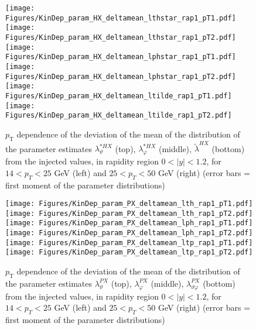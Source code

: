 \documentclass[12pt]{article}
\newcommand{\pT}{p_\mathrm{T}}
\newcommand{\absy}{\left |  y \right |}
\newcommand{\lamtildeHX}{\tilde{\lambda}^{\scriptscriptstyle HX}}
\newcommand{\lamthstarHX}{\lambda^{* \scriptscriptstyle HX}_\vartheta}
\newcommand{\lamphstarHX}{\lambda^{* \scriptscriptstyle HX}_\varphi}
\newcommand{\lamthPX}{\lambda^{\scriptscriptstyle PX}_\vartheta}
\newcommand{\lamphPX}{\lambda^{\scriptscriptstyle PX}_\varphi}
\newcommand{\lamthphPX}{\lambda^{\scriptscriptstyle PX}_{\vartheta \varphi}}
\begin{document}
\begin{figure}[htbp]
\centering
\texttt{[image: Figures/KinDep\_param\_HX\_deltamean\_lthstar\_rap1\_pT1.pdf]}
\texttt{[image: Figures/KinDep\_param\_HX\_deltamean\_lthstar\_rap1\_pT2.pdf]}
\texttt{[image: Figures/KinDep\_param\_HX\_deltamean\_lphstar\_rap1\_pT1.pdf]}
\texttt{[image: Figures/KinDep\_param\_HX\_deltamean\_lphstar\_rap1\_pT2.pdf]}
\texttt{[image: Figures/KinDep\_param\_HX\_deltamean\_ltilde\_rap1\_pT1.pdf]}
\texttt{[image: Figures/KinDep\_param\_HX\_deltamean\_ltilde\_rap1\_pT2.pdf]}
\caption{$\pT$ dependence of the deviation of the mean of the distribution of
the parameter estimates $\lamthstarHX$ (top), $\lamphstarHX$ (middle),
$\lamtildeHX$ (bottom) from the injected values, in rapidity region $0<\absy<1.2$, for $14 < p_T < 25$ GeV (left) and
$25 < p_T < 50$ GeV (right) (error bars = first moment of
the parameter distributions)}
\end{figure}
\clearpage











\begin{figure}[htbp]
\centering
\texttt{[image: Figures/KinDep\_param\_PX\_deltamean\_lth\_rap1\_pT1.pdf]}
\texttt{[image: Figures/KinDep\_param\_PX\_deltamean\_lth\_rap1\_pT2.pdf]}
\texttt{[image: Figures/KinDep\_param\_PX\_deltamean\_lph\_rap1\_pT1.pdf]}
\texttt{[image: Figures/KinDep\_param\_PX\_deltamean\_lph\_rap1\_pT2.pdf]}
\texttt{[image: Figures/KinDep\_param\_PX\_deltamean\_ltp\_rap1\_pT1.pdf]}
\texttt{[image: Figures/KinDep\_param\_PX\_deltamean\_ltp\_rap1\_pT2.pdf]}
\caption{$\pT$ dependence of the deviation of the mean of the distribution of
the parameter estimates $\lamthPX$ (top), $\lamphPX$ (middle), $\lamthphPX$
(bottom) from the injected values, in rapidity region $0<\absy<1.2$, for $14 < p_T < 25$ GeV (left) and
$25 < p_T < 50$ GeV (right) (error bars = first moment of the parameter
distributions)}
\end{figure}
\clearpage
\end{document}
